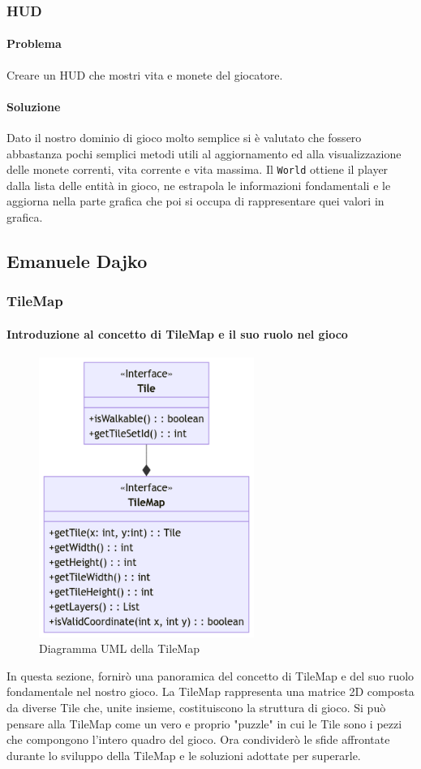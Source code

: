 \documentclass[a4paper,12pt]{report}
\begin{document}
\subsubsection{HUD}

\paragraph{Problema}
Creare un HUD che mostri vita e monete del giocatore.
\paragraph{Soluzione}
Dato il nostro dominio di gioco molto semplice si è valutato 
che fossero abbastanza pochi semplici metodi utili al aggiornamento 
ed alla visualizzazione delle monete correnti, vita corrente e vita massima.
Il \texttt{World} ottiene il player dalla lista delle entità in gioco, 
ne estrapola le informazioni fondamentali e le aggiorna nella parte grafica 
che poi si occupa di rappresentare quei valori in grafica.

\subsection{Emanuele Dajko}
\subsubsection{TileMap}
\paragraph*{Introduzione al concetto di TileMap e il suo ruolo nel gioco}
\begin{figure}[h]
	\centering
	\includegraphics[width=7cm]{uml/TileMap.png}
	\caption{Diagramma UML della TileMap}
\end{figure}
In questa sezione, fornirò una panoramica del concetto di TileMap e del suo ruolo fondamentale nel nostro gioco.
La TileMap rappresenta una matrice 2D composta da diverse Tile che, unite insieme, costituiscono la struttura di gioco. 
Si può pensare alla TileMap come un vero e proprio "puzzle" in cui le Tile sono i pezzi che compongono l'intero quadro del gioco. 
Ora condividerò le sfide affrontate durante lo sviluppo della TileMap e le soluzioni adottate per superarle.
\end{document}
